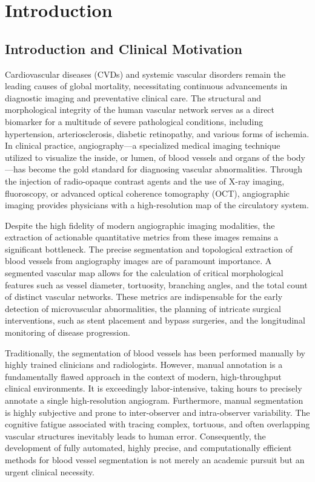 \chapter{Introduction}
\label{ch:introduction}

\section{Introduction and Clinical Motivation}
Cardiovascular diseases (CVDs) and systemic vascular disorders remain the leading causes of global mortality, necessitating continuous advancements in diagnostic imaging and preventative clinical care. The structural and morphological integrity of the human vascular network serves as a direct biomarker for a multitude of severe pathological conditions, including hypertension, arteriosclerosis, diabetic retinopathy, and various forms of ischemia. In clinical practice, angiography---a specialized medical imaging technique utilized to visualize the inside, or lumen, of blood vessels and organs of the body---has become the gold standard for diagnosing vascular abnormalities. Through the injection of radio-opaque contrast agents and the use of X-ray imaging, fluoroscopy, or advanced optical coherence tomography (OCT), angiographic imaging provides physicians with a high-resolution map of the circulatory system. 

Despite the high fidelity of modern angiographic imaging modalities, the extraction of actionable quantitative metrics from these images remains a significant bottleneck. The precise segmentation and topological extraction of blood vessels from angiography images are of paramount importance. A segmented vascular map allows for the calculation of critical morphological features such as vessel diameter, tortuosity, branching angles, and the total count of distinct vascular networks. These metrics are indispensable for the early detection of microvascular abnormalities, the planning of intricate surgical interventions, such as stent placement and bypass surgeries, and the longitudinal monitoring of disease progression.

Traditionally, the segmentation of blood vessels has been performed manually by highly trained clinicians and radiologists. However, manual annotation is a fundamentally flawed approach in the context of modern, high-throughput clinical environments. It is exceedingly labor-intensive, taking hours to precisely annotate a single high-resolution angiogram. Furthermore, manual segmentation is highly subjective and prone to inter-observer and intra-observer variability. The cognitive fatigue associated with tracing complex, tortuous, and often overlapping vascular structures inevitably leads to human error. Consequently, the development of fully automated, highly precise, and computationally efficient methods for blood vessel segmentation is not merely an academic pursuit but an urgent clinical necessity.

